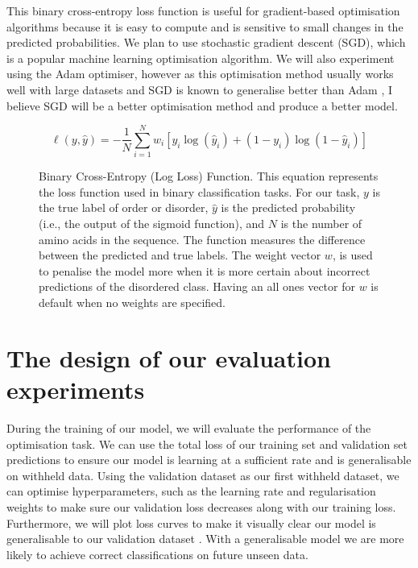 \documentclass{l4proj}
\begin{document}
This binary cross-entropy loss function is useful for gradient-based optimisation algorithms because it is easy to compute and is sensitive to small changes in the predicted probabilities. We plan to use stochastic gradient descent (SGD), which is a popular machine learning optimisation algorithm. We will also experiment using the Adam optimiser, however as this optimisation method usually works well with large datasets and SGD is known to generalise better than Adam \citep{Zhou:20}, I believe SGD will be a better optimisation method and produce a better model. 

\begin{figure}[h]
    \centering
    \begin{equation}
    \ell(y, \hat{y}) = -\frac{1}{N} \sum_{i=1}^{N} w_i [ y_i \log(\hat{y}_i) + (1-y_i)\log(1-\hat{y}_i)]
    \end{equation}
    \caption{Binary Cross-Entropy (Log Loss) Function. This equation represents the loss function used in binary classification tasks. For our task, $y$ is the true label of order or disorder, $\hat{y}$ is the predicted probability (i.e., the output of the sigmoid function), and $N$ is the number of amino acids in the sequence. The function measures the difference between the predicted and true labels. The weight vector $w$, is used to penalise the model more when it is more certain about incorrect predictions of the disordered class. Having an all ones vector for $w$ is default when no weights are specified.}
    \label{fig:bceloss}
\end{figure}

\section{The design of our evaluation experiments}

During the training of our model, we will evaluate the performance of the optimisation task. We can use the total loss of our training set and validation set predictions to ensure our model is learning at a sufficient rate and is generalisable on withheld data. Using the validation dataset as our first withheld dataset, we can optimise hyperparameters, such as the learning rate and regularisation weights to make sure our validation loss decreases along with our training loss. Furthermore, we will plot loss curves to make it visually clear our model is generalisable to our validation dataset \citep{Brownlee:19}. With a generalisable model we are more likely to achieve correct classifications on future unseen data. 
\end{document}
